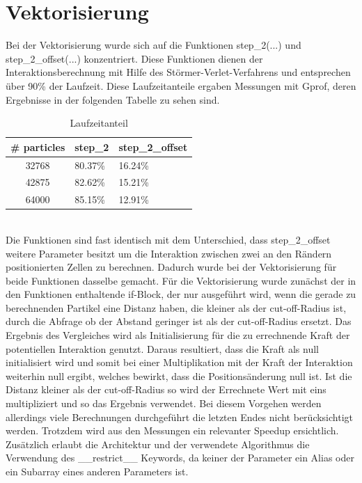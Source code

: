 \documentclass[
12pt,
a4paper,
BCOR10mm,
DIV14,
headsepline,
]{scrreprt}
\begin{document}
	\section{Vektorisierung}
	Bei der Vektorisierung wurde sich auf die Funktionen step\_2(...) und step\_2\_offset(...) konzentriert. Diese Funktionen dienen der Interaktionsberechnung mit Hilfe des Störmer-Verlet-Verfahrens und entsprechen über 90\% der Laufzeit. Diese Laufzeitanteile ergaben Messungen mit Gprof, deren Ergebnisse in der folgenden Tabelle zu sehen sind. 
	\begin{table}[h]
		\centering
		\begin{tabular}{c|l|l}
			\# particles  & step\_2 &  step\_2\_offset \\
			\hline
			32768 & 80.37\% & 16.24\% \\
			\hline
			42875 & 82.62\% & 15.21\%\\
			\hline
			64000 & 85.15\% & 12.91\%\\
		\end{tabular}
		\caption{Laufzeitanteil}
		\label{table:Laufzeitanteil}
	\end{table}\\
	Die Funktionen sind fast identisch mit dem Unterschied, dass step\_2\_offset weitere Parameter besitzt um die Interaktion zwischen zwei an den Rändern positionierten Zellen zu berechnen. Dadurch wurde bei der Vektorisierung für beide Funktionen dasselbe gemacht. Für die Vektorisierung wurde zunächst der in den Funktionen enthaltende if-Block, der nur ausgeführt wird, wenn die gerade zu berechnenden Partikel eine Distanz haben, die kleiner als der cut-off-Radius ist, durch die Abfrage ob der Abstand geringer ist als der cut-off-Radius ersetzt. Das Ergebnis des Vergleiches wird als Initialisierung für die  zu errechnende Kraft der potentiellen Interaktion genutzt. Daraus resultiert, dass die Kraft als null initialisiert wird und somit bei einer Multiplikation mit der Kraft der Interaktion weiterhin null ergibt, welches bewirkt, dass die Positionsänderung null ist. Ist die Distanz kleiner als der cut-off-Radius so wird der Errechnete Wert mit eins multipliziert und so das Ergebnis verwendet. Bei diesem Vorgehen werden allerdings viele Berechnungen durchgeführt die letzten Endes nicht berücksichtigt werden. Trotzdem wird aus den Messungen ein  relevanter Speedup ersichtlich. Zusätzlich erlaubt die Architektur und der verwendete Algorithmus die Verwendung des \_\_restrict\_\_ Keywords, da keiner der Parameter ein Alias oder ein Subarray eines anderen Parameters ist.
\end{document}
